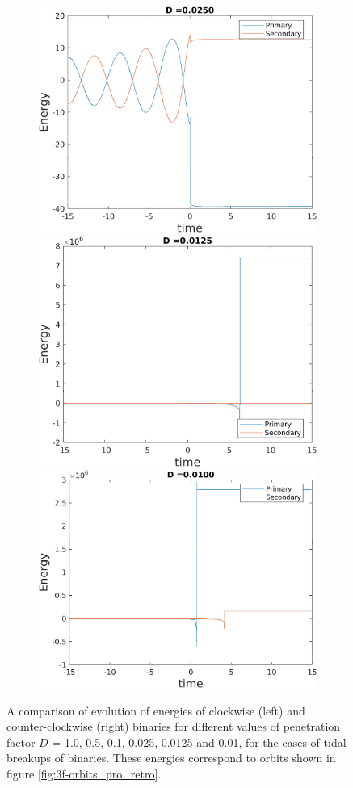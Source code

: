 \documentclass[a4paper]{article}
\begin{document}
\begin{enumerate} [label*=\textbf{(\alph*)}]
\begin{figure} [h]
\begin{subfigure} {.425\linewidth}
						\vspace{1.5mm}
						\includegraphics[width=\linewidth, height =.55\linewidth] {../plots/3f/prograde_energies/3.png}\\
						\vspace{1.5mm}
						\includegraphics[width=\linewidth, height =.55\linewidth] {../plots/3f/prograde_energies/2.png}\\
						\vspace{1.5mm}
						\includegraphics[width=\linewidth, height =.55\linewidth] {../plots/3f/prograde_energies/1.png}
					\end{subfigure}
					\caption{A comparison of evolution of energies of clockwise (left) and counter-clockwise (right) binaries for different values of penetration factor \(D\) = 1.0, 0.5, 0.1, 0.025, 0.0125 and 0.01, for the cases of tidal breakups of binaries. These energies correspond to orbits shown in figure \ref{fig:3f-orbits_pro_retro}.}
					\label{fig:3f-energies_pro_retro}
				\end{figure}
				

\end{enumerate}
\end{document}
